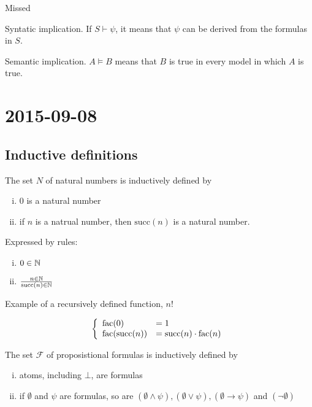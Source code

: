 \documentclass[12pt]{report}
\newcommand{\cF}{\mathcal{F}}
\begin{document}
Missed


\begin{skgr}
  Syntatic implication.
  If $S \vdash \psi$, it means that $\psi$ can be
  derived from the formulas in $S$.
\end{skgr}

\begin{skgr}
Semantic implication.
$A \models B$ means that $B$ is true in every model in which $A$ is true.
  
\end{skgr}

\chapter{2015-09-08}

\section{Inductive definitions}

The set $N$ of natural numbers is inductively defined by
\begin{enumerate}[(i)]
\item 0 is a natural number
\item if $n$ is a natrual number, then $\text{succ}(n)$ is a natural number.
\end{enumerate}

Expressed by rules:
\begin{enumerate}[(i)]
\item $0 \in \mathbb{N}$
\item $\frac{n \in \mathbb{N}}{\text{succ}(n) \in \mathbb{N}}$
\end{enumerate}

Example of a recursively defined function, $n!$

\[\left\{ \begin{array}{l l} \text{fac}(0) & = 1 \\ \text{fac(succ($n$))} & = \text{succ}(n) \cdot
  \text{fac}(n) \end{array} \right. \]


The set $\cF$ of proposistional formulas is inductively defined by
\begin{enumerate}[(i)]
\item  atoms, including $\bot$, are formulas
\item if $\emptyset$ and $\psi$ are formulas, so are
$(\emptyset \wedge \psi),
 (\emptyset \vee \psi),
 (\emptyset \to \psi)$
and $(\lnot \emptyset)$
\end{enumerate}
\end{document}
